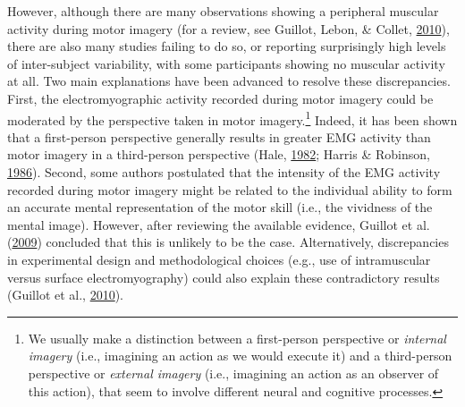\documentclass[a4paper,12pt,twoside,openright,oldfontcommands,final]{memoir}
\let\rmarkdownfootnote\footnote%
\def\footnote{\protect\rmarkdownfootnote}
\begin{document}
However, although there are many observations showing a peripheral muscular activity during motor imagery (for a review, see Guillot, Lebon, \& Collet, \protect\hyperlink{ref-guillot_electromyographic_2010}{2010}), there are also many studies failing to do so, or reporting surprisingly high levels of inter-subject variability, with some participants showing no muscular activity at all. Two main explanations have been advanced to resolve these discrepancies. First, the electromyographic activity recorded during motor imagery could be moderated by the perspective taken in motor imagery.\footnote{We usually make a distinction between a first-person perspective or \emph{internal imagery} (i.e., imagining an action as we would execute it) and a third-person perspective or \emph{external imagery} (i.e., imagining an action as an observer of this action), that seem to involve different neural and cognitive processes.} Indeed, it has been shown that a first-person perspective generally results in greater EMG activity than motor imagery in a third-person perspective (Hale, \protect\hyperlink{ref-hale_effects_1982}{1982}; Harris \& Robinson, \protect\hyperlink{ref-harris_effects_1986}{1986}). Second, some authors postulated that the intensity of the EMG activity recorded during motor imagery might be related to the individual ability to form an accurate mental representation of the motor skill (i.e., the vividness of the mental image). However, after reviewing the available evidence, Guillot et al. (\protect\hyperlink{ref-guillot_brain_2009}{2009}) concluded that this is unlikely to be the case. Alternatively, discrepancies in experimental design and methodological choices (e.g., use of intramuscular versus surface electromyography) could also explain these contradictory results (Guillot et al., \protect\hyperlink{ref-guillot_electromyographic_2010}{2010}).

\vspace{2mm}
\end{document}
